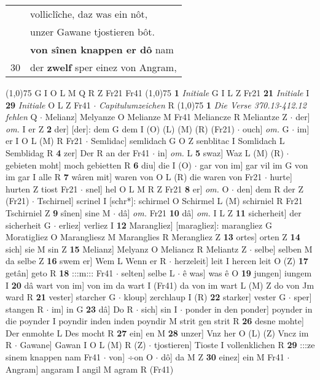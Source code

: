 \documentclass[8pt,a4paper,notitlepage]{article}
\begin{document}
\begin{table}[ht]
\begin{minipage}[t]{0.5\linewidth}
\begin{tabular}{rl}
 & volliclîche, daz was ein nôt,\\ 
 & unzer Gawane tjostieren bôt.\\ 
 & \textbf{von sînen knappen er dô} nam\\ 
30 & der \textbf{zwelf} sper einez von Angram,\\ 
\end{tabular}
\scriptsize
\line(1,0){75} \newline
G I O L M Q R Z Fr21 Fr41 \newline
\line(1,0){75} \newline
\textbf{1} \textit{Initiale} G I L Z Fr21  \textbf{21} \textit{Initiale} I  \textbf{29} \textit{Initiale} O L Z Fr41   $\cdot$ \textit{Capitulumzeichen} R  \newline
\line(1,0){75} \newline
\textbf{1} \textit{Die Verse 370.13-412.12 fehlen} Q   $\cdot$ Melianz] Melyanze O Melianze M Fr41 Meliancze R Meliantze Z  $\cdot$ der] \textit{om.} I er Z \textbf{2} der] [der]: dem G dem I (O) (L) (M) (R) (Fr21)  $\cdot$ ouch] \textit{om.} G  $\cdot$ im] er I O L (M) R Fr21  $\cdot$ Semlidac] semlidach G O Z senblitac I Somlidach L Semblidag R \textbf{4} zer] Der R an der Fr41  $\cdot$ in] \textit{om.} L \textbf{5} swaz] Waz L (M) (R)  $\cdot$ gebieten moht] moch gebietten R \textbf{6} diu] die I (O)  $\cdot$ gar von im] gar vil im G von im gar I alle R \textbf{7} wâren mit] waren von O L (R) die waren von Fr21  $\cdot$ hurte] hurten Z tiost Fr21  $\cdot$ snel] hel O L M R Z Fr21 \textbf{8} er] \textit{om.} O  $\cdot$ den] dem R der Z (Fr21)  $\cdot$ Tschirnel] scrinel I [schr*]: schirmel O Schirmel L (M) schirniel R Fr21 Tschirniel Z \textbf{9} sînen] sine M  $\cdot$ dâ] \textit{om.} Fr21 \textbf{10} dâ] \textit{om.} I L Z \textbf{11} sicherheit] der sicherheit G  $\cdot$ erliez] verliez I \textbf{12} Marangliez] [maragliez]: marangliez G Moratigliez O Marangliesz M Maranglies R Merangliez Z \textbf{13} ortes] orten Z \textbf{14} sich] sie M sin Z \textbf{15} Melianz] Melyanz O Meliancz R Meliantz Z  $\cdot$ selbe] selben M da selbe Z \textbf{16} swem er] Wem L Wenn er R  $\cdot$ herzeleit] leit I hercen leit O (Z) \textbf{17} getân] geto R \textbf{18} :::m::: Fr41  $\cdot$ selten] selbe L  $\cdot$ ê was] was ê O \textbf{19} jungen] iungem I \textbf{20} dâ wart von im] von im da wart I (Fr41) da von im wart L (M) Z do von Jm ward R \textbf{21} vester] starcher G  $\cdot$ kloup] zerchlaup I (R) \textbf{22} starker] vester G  $\cdot$ sper] stangen R  $\cdot$ im] in G \textbf{23} dâ] Do R  $\cdot$ sich] sin I  $\cdot$ ponder in den ponder] poynder in die poynder I poyndir inden inden poyndir M strit gen strit R \textbf{26} desne mohte] Der enmohte L Des mocht R \textbf{27} ein] en M \textbf{28} unzer] Vnz her O (L) (Z) Vncz im R  $\cdot$ Gawane] Gawan I O L (M) R (Z)  $\cdot$ tjostieren] Tioste I vollenklichen R \textbf{29} :::ze sinem knappen nam Fr41  $\cdot$ von] ÷on O  $\cdot$ dô] da M Z \textbf{30} einez] ein M Fr41  $\cdot$ Angram] angaram I angil M agram R (Fr41) \newline

\end{minipage}
\end{table}
\end{document}
